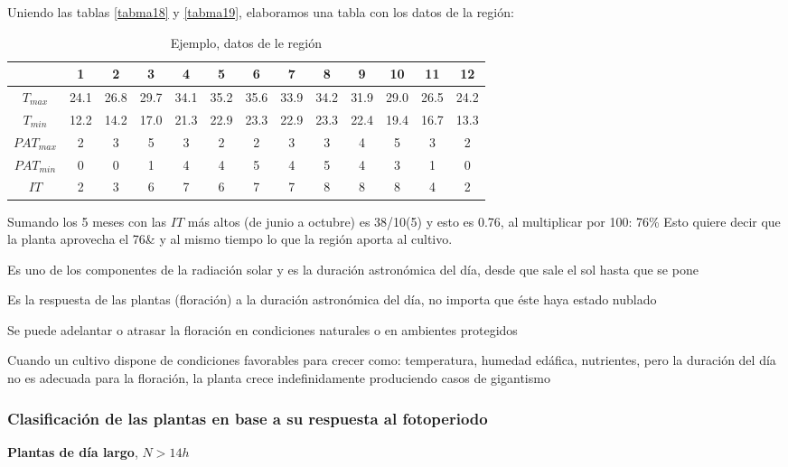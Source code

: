 Uniendo las tablas \ref{tabma18} y \ref{tabma19}, elaboramos una tabla con los datos de la región:
\begin{table}[h!]
    \centering
    \begin{tabular}{@{}ccccccccccccc@{}}
    \toprule
                & 1    & 2    & 3    & 4    & 5    & 6    & 7    & 8    & 9    & 10   & 11   & 12   \\ \midrule
    $T_{max}$   & 24.1 & 26.8 & 29.7 & 34.1 & 35.2 & 35.6 & 33.9 & 34.2 & 31.9 & 29.0 & 26.5 & 24.2 \\
    $T_{min}$   & 12.2 & 14.2 & 17.0 & 21.3 & 22.9 & 23.3 & 22.9 & 23.3 & 22.4 & 19.4 & 16.7 & 13.3 \\
    $PAT_{max}$ & 2    & 3    & 5    & 3    & 2    & 2    & 3    & 3    & 4    & 5    & 3    & 2    \\
    $PAT_{min}$ & 0    & 0    & 1    & 4    & 4    & 5    & 4    & 5    & 4    & 3    & 1    & 0    \\
    $IT$        & 2    & 3    & 6    & 7    & 6    & 7    & 7    & 8    & 8    & 8    & 4    & 2    \\ \bottomrule
    \end{tabular}
    \caption{Ejemplo, datos de le región}
    \label{tabma20}
\end{table}
Sumando los 5 meses con las $IT$ más altos (de junio a octubre) es 38/10(5) y esto es 0.76, al multiplicar por 100: 76\%
Esto quiere decir que la planta aprovecha el 76\& y al mismo tiempo lo que la región aporta al cultivo.

\begin{definition}[Fotoperiodo]
    Es uno de los componentes de la radiación solar y es la duración astronómica del día, desde que sale el sol hasta que se pone
\end{definition}
\begin{definition}[Fotoperiodismo]
    Es la respuesta de las plantas (floración) a la duración astronómica del día, no importa que éste haya estado nublado
\end{definition}
Se puede adelantar o atrasar la floración en condiciones naturales o en ambientes protegidos

Cuando un cultivo dispone de condiciones favorables para crecer como: temperatura, humedad edáfica, nutrientes, pero la duración del día no es adecuada para la floración, la planta crece indefinidamente produciendo casos de gigantismo

\subsubsection{Clasificación de las plantas en base a su respuesta al fotoperiodo}
\textbf{Plantas de día largo}, $N > 14h$

